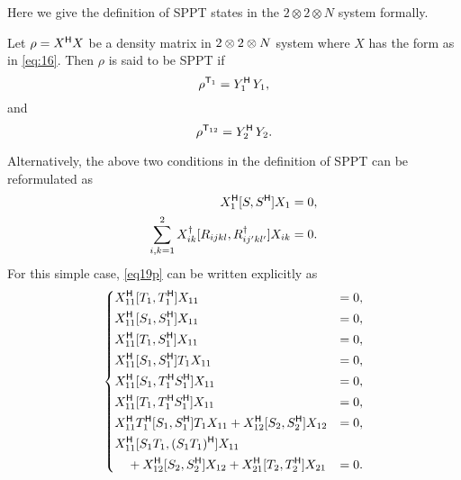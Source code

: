  
Here we give the definition of  SPPT states in the $2\otimes 2\otimes N$ system formally.
\begin{defi}
  Let $\rho = X^{\mathsf{H}} X$ be a density matrix in  $2\otimes 2\linebreak\otimes N $ system where $X$ has the  form as in \cref{eq:16}. Then
  $\rho$ is said to be SPPT if 
  \begin{equation}
    \label{eq:17}
    \rho^{\mathsf{T}_1} = Y_1^{\mathsf{H}}\,Y_1 ,
  \end{equation}
  and
  \begin{equation}
    \label{eq:18}
    \rho^{\mathsf{T}_{12}} = Y_2^{\mathsf{H}}\,Y_2.
  \end{equation}
\end{defi}
Alternatively, the above two conditions in the definition of SPPT can be reformulated as
\begin{equation}
\label{eq19p}
\begin{split}
X^{\mathsf{H}}_1[S,S^{\mathsf{H}}]X_1 &= 0,\\
\sum_{i,k=1}^2 X^\dagger_{ik}[ R_{ijkl},R^\dagger_{ij'kl'}]X_{ik} &= 0.
\end{split}
\end{equation}
For this simple case, \cref{eq19p} can be written  explicitly as
\begin{equation}
  \label{eq:19}
  \left\lbrace
    \begin{aligned}
     & X^{\mathsf{H}}_{11} [T_1,T^{\mathsf{H}}_1] X_{11} &= 0,\\
      &X^{\mathsf{H}}_{11} [ S_1,S^{\mathsf{H}}_1] X_{11} & =0,\\
      &X^{\mathsf{H}}_{11}[T_1,S^{\mathsf{H}}_1] X_{11} & = 0,\\
       &X^{\mathsf{H}}_{11} [S_1,S^{\mathsf{H}}_1 ] T_1 X_{11}& = 0,\\
      &X^{\mathsf{H}}_{11} [ S_1,T^{\mathsf{H}}_1S^{\mathsf{H}}_1] X_{11} &  = 0,\\
      &X^{\mathsf{H}}_{11} [ T_1,T^{\mathsf{H}}_1S^{\mathsf{H}}_1] X_{11} & = 0,\\
            &X^{\mathsf{H}}_{11} T^{\mathsf{H}}_1[ S_1,S^{\mathsf{H}}_1]T_1 X_{11}+X^{\mathsf{H}}_{12}[S_2,S^{\mathsf{H}}_2]X_{12} & = 0,\\
      &X^{\mathsf{H}}_{11} [ S_1T_1,(S_1T_1)^{\mathsf{H}}] X_{11} \\
      &\quad+ X^{\mathsf{H}}_{12}[  S_2,S^{\mathsf{H}}_2]X_{12} + X^{\mathsf{H}}_{21} [ T_2,T^{\mathsf{H}}_2] X_{21}&=0.\\
    \end{aligned}
  \right.
\end{equation}

